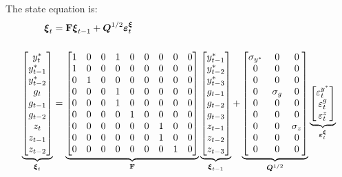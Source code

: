 \documentclass[a4paper,12pt]{article}
\begin{document}
\esq The state equation is:%
\begin{align}
\boldsymbol{\xi }_{t}& =\mathbf{F}\boldsymbol{\xi }_{t-1}+\boldsymbol{Q}%
^{1/2}\boldsymbol{\varepsilon }_{t}^{\boldsymbol{\xi }}  \notag \\[5mm]
\underbrace{%
\begin{bmatrix}
y_{t}^{\ast } \\ 
y_{t-1}^{\ast } \\ 
y_{t-2}^{\ast } \\ 
g_{t} \\ 
g_{t-1} \\ 
g_{t-2} \\ 
z_{t} \\ 
z_{t-1} \\ 
z_{t-2}%
\end{bmatrix}%
}_{\boldsymbol{\xi }_{t}}& =\underbrace{%
\begin{bmatrix}
1 & 0 & 0 & 1 & 0 & 0 & 0 & 0 & 0 \\ 
1 & 0 & 0 & 0 & 0 & 0 & 0 & 0 & 0 \\ 
0 & 1 & 0 & 0 & 0 & 0 & 0 & 0 & 0 \\ 
0 & 0 & 0 & 1 & 0 & 0 & 0 & 0 & 0 \\ 
0 & 0 & 0 & 1 & 0 & 0 & 0 & 0 & 0 \\ 
0 & 0 & 0 & 0 & 1 & 0 & 0 & 0 & 0 \\ 
0 & 0 & 0 & 0 & 0 & 0 & 1 & 0 & 0 \\ 
0 & 0 & 0 & 0 & 0 & 0 & 1 & 0 & 0 \\ 
0 & 0 & 0 & 0 & 0 & 0 & 0 & 1 & 0%
\end{bmatrix}%
}_{\mathbf{F}}\underbrace{%
\begin{bmatrix}
y_{t-1}^{\ast } \\ 
y_{t-2}^{\ast } \\ 
y_{t-3}^{\ast } \\ 
g_{t-1} \\ 
g_{t-2} \\ 
g_{t-3} \\ 
z_{t-1} \\ 
z_{t-2} \\ 
z_{t-3}%
\end{bmatrix}%
}_{\boldsymbol{\xi }_{t-1}}+\underbrace{%
\begin{bmatrix}
\sigma _{y^{\ast }} & 0 & 0 \\ 
0 & 0 & 0 \\ 
0 & 0 & 0 \\ 
0 & \sigma _{g} & 0 \\ 
0 & 0 & 0 \\ 
0 & 0 & 0 \\ 
0 & 0 & \sigma _{z} \\ 
0 & 0 & 0 \\ 
0 & 0 & 0%
\end{bmatrix}%
}_{\boldsymbol{Q}^{1/2}}\underbrace{%
\begin{bmatrix}
\varepsilon _{t}^{y^{\ast }} \\ 
\varepsilon _{t}^{g} \\ 
\varepsilon _{t}^{z}%
\end{bmatrix}%
}_{\boldsymbol{\varepsilon }_{t}^{\boldsymbol{\xi }}}  \label{state1}
\end{align}
\end{document}
